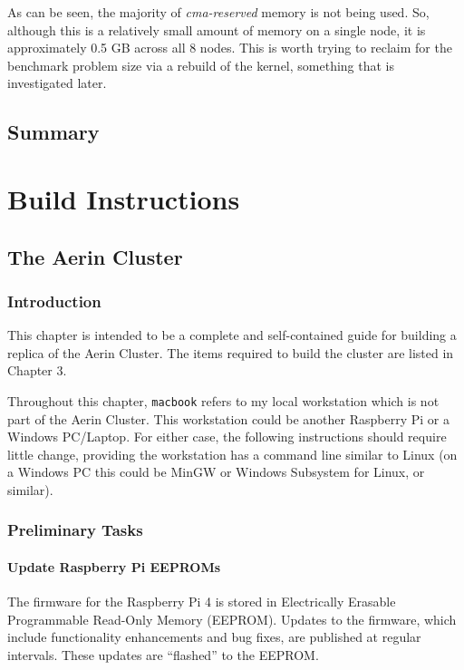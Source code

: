 \documentclass{report}
\begin{document}
As can be seen, the majority of \emph{cma-reserved} memory is not being used. So, although this is a relatively small amount of memory on a single node, it is approximately 0.5 GB across all 8 nodes. This is worth trying to reclaim for the benchmark problem size via a rebuild of the kernel, something that is investigated later.



%
%
\chapter{Summary}



%
%
\part{Build Instructions}

%
%
\chapter{The Aerin Cluster}


%
%
\section{Introduction}

This chapter is intended to be a complete and self-contained guide for building a replica of the Aerin Cluster. The items required to build the cluster are listed in Chapter 3.

Throughout this chapter, \verb|macbook| refers to my local workstation which is not part of the Aerin Cluster. This workstation could be another Raspberry Pi or a Windows PC/Laptop. For either case, the following instructions should require little change, providing the workstation has a command line similar to Linux (on a Windows PC this could be MinGW or Windows Subsystem for Linux, or similar).


%
%
\section{Preliminary Tasks}


%
%
\subsection{Update Raspberry Pi EEPROMs}

The firmware for the Raspberry Pi 4 is stored in Electrically Erasable Programmable Read-Only Memory (EEPROM). Updates to the firmware, which include functionality enhancements and bug fixes, are published at regular intervals. These updates are ``flashed'' to the EEPROM.
\end{document}
